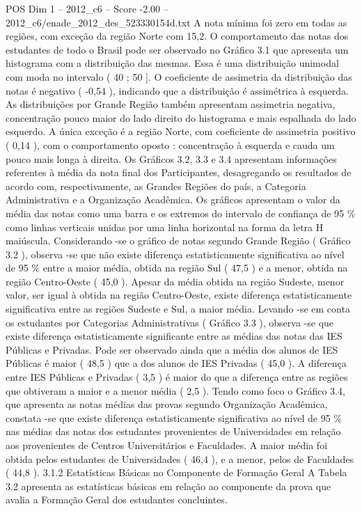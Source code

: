 \begin{textsample}{POS Dim 1 – 2012\_c6 – Score -2.00 – 2012\_c6/enade\_2012\_des\_523330154d.txt}
A nota mínima foi zero em todas as regiões, com exceção da região Norte com 15,2.
O comportamento das notas dos estudantes de todo o Brasil pode ser observado no Gráfico 3.1 que apresenta um histograma com a distribuição das mesmas.
Essa é uma distribuição unimodal com moda no intervalo ( 40 ; 50 ].
O coeficiente de assimetria da distribuição das notas é negativo ( -0,54 ), indicando que a distribuição é assimétrica à esquerda.
As distribuições por Grande Região também apresentam assimetria negativa, concentração pouco maior do lado direito do histograma e mais espalhada do lado esquerdo.
A única exceção é a região Norte, com coeficiente de assimetria positivo ( 0,14 ), com o comportamento oposto : concentração à esquerda e cauda um pouco mais longa à direita.
Os Gráficos 3.2, 3.3 e 3.4 apresentam informações referentes à média da nota final dos Participantes, desagregando os resultados de acordo com, respectivamente, as Grandes Regiões do país, a Categoria Administrativa e a Organização Acadêmica.
Os gráficos apresentam o valor da média das notas como uma barra e os extremos do intervalo de confiança de 95 \% como linhas verticais unidas por uma linha horizontal na forma da letra H maiúscula.
Considerando -se o gráfico de notas segundo Grande Região ( Gráfico 3.2 ), observa -se que não existe diferença estatisticamente significativa ao nível de 95 \% entre a maior média, obtida na região Sul ( 47,5 ) e a menor, obtida na região Centro-Oeste ( 45,0 ).
Apesar da média obtida na região Sudeste, menor valor, ser igual à obtida na região Centro-Oeste, existe diferença estatisticamente significativa entre as regiões Sudeste e Sul, a maior média.
Levando -se em conta os estudantes por Categorias Administrativas ( Gráfico 3.3 ), observa -se que existe diferença estatisticamente significante entre as médias das notas das IES Públicas e Privadas.
Pode ser observado ainda que a média dos alunos de IES Públicas é maior ( 48,5 ) que a dos alunos de IES Privadas ( 45,0 ).
A diferença entre IES Públicas e Privadas ( 3,5 ) é maior do que a diferença entre as regiões que obtiveram a maior e a menor média ( 2,5 ).
Tendo como foco o Gráfico 3.4, que apresenta as notas médias das provas segundo Organização Acadêmica, constata -se que existe diferença estatisticamente significativa ao nível de 95 \% nas médias das notas dos estudantes provenientes de Universidades em relação aos provenientes de Centros Universitários e Faculdades.
A maior média foi obtida pelos estudantes de Universidades ( 46,4 ), e a menor, pelos de Faculdades ( 44,8 ). 3.1.2 Estatísticas Básicas no Componente de Formação Geral A Tabela 3.2 apresenta as estatísticas básicas em relação ao componente da prova que avalia a Formação Geral dos estudantes concluintes.

\end{textsample}
